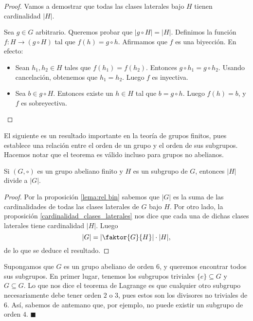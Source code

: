\begin{proof}
Vamos a demostrar que todas las clases laterales bajo $H$ tienen cardinalidad $|H|$.

Sea $g \in G$ arbitrario. Queremos probar que $|g \circ H| = |H|$. Definimos la función $f\colon H \rightarrow (g \circ H)$ tal que $f(h) = g \circ h$. Afirmamos que $f$ es una biyección. En efecto: 
\begin{itemize}
\item Sean $h_1, h_2 \in H$ tales que $f(h_1) = f(h_2)$. Entonces $g \circ h_1 = g \circ h_2$. Usando cancelación, obtenemos que $h_1 = h_2$. Luego $f$ es inyectiva.
\item Sea $b \in g \circ H$. Entonces existe un $h \in H$ tal que $b = g \circ h$. Luego $f(h) = b$, y $f$ es sobreyectiva.
\end{itemize}
\end{proof}


El siguiente es un resultado importante en la teoría de grupos finitos, pues establece una relación entre el orden de un grupo y el orden de sus subgrupos. Hacemos notar que el teorema es válido incluso para grupos no abelianos. 

\begin{theorem}[Lagrange]
\label{teo:lagrange}
Si $(G, \circ)$ es un grupo abeliano finito y $H$ es un subgrupo de $G$, entonces $|H|$ divide a $|G|$.
\end{theorem}

\begin{proof}
Por la proposición \ref{lema:rel bin} sabemos que $|G|$ es la suma de las cardinalidades de todas las clases laterales de $G$ bajo $H$. Por otro lado, la proposición \ref{cardinalidad_clases_laterales} nos dice que cada una de dichas clases laterales tiene cardinalidad $|H|$. Luego $$|G| = \left| \faktor{G}{H}\right| \cdot |H|,$$ de lo que se deduce el resultado. 
\end{proof}

\begin{example} \label{ejemplo_lagrange}
Supongamos que $G$ es un grupo abeliano de orden $6$, y queremos encontrar todos sus subgrupos. En primer lugar, tenemos los subgrupos triviales $\{e\} \subseteq G$ y $G \subseteq G$. Lo que nos dice el teorema de Lagrange es que cualquier otro subgrupo necesariamente debe tener orden $2$ o $3$, pues estos son los divisores no triviales de $6$. Así, sabemos de antemano que, por ejemplo, no puede existir un subgrupo de orden $4$.
\hfill$\blacksquare$
\end{example}

